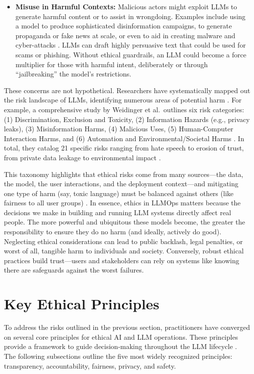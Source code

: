 \begin{itemize}
    \item \textbf{Misuse in Harmful Contexts:} Malicious actors might exploit LLMs to generate harmful content or to assist in wrongdoing. Examples include using a model to produce sophisticated disinformation campaigns, to generate propaganda or fake news at scale, or even to aid in creating malware and cyber-attacks \cite{ar5iv_labs}. LLMs can draft highly persuasive text that could be used for scams or phishing. Without ethical guardrails, an LLM could become a force multiplier for those with harmful intent, deliberately or through ``jailbreaking'' the model's restrictions.
\end{itemize}

These concerns are not hypothetical. Researchers have systematically mapped out the risk landscape of LLMs, identifying numerous areas of potential harm \cite{ar5iv_labs}. For example, a comprehensive study by Weidinger et al.\ outlines six risk categories: (1) Discrimination, Exclusion and Toxicity, (2) Information Hazards (e.g., privacy leaks), (3) Misinformation Harms, (4) Malicious Uses, (5) Human-Computer Interaction Harms, and (6) Automation and Environmental/Societal Harms \cite{ar5iv_labs}. In total, they catalog 21 specific risks ranging from hate speech to erosion of trust, from private data leakage to environmental impact \cite{ar5iv_labs}.

This taxonomy highlights that ethical risks come from many sources---the data, the model, the user interactions, and the deployment context---and mitigating one type of harm (say, toxic language) must be balanced against others (like fairness to all user groups) \cite{ar5iv_labs}. In essence, ethics in LLMOps matters because the decisions we make in building and running LLM systems directly affect real people. The more powerful and ubiquitous these models become, the greater the responsibility to ensure they do no harm (and ideally, actively do good). Neglecting ethical considerations can lead to public backlash, legal penalties, or worst of all, tangible harm to individuals and society. Conversely, robust ethical practices build trust---users and stakeholders can rely on systems like \ishtar{} knowing there are safeguards against the worst failures.

\section{Key Ethical Principles}\label{sec:ethics-principles}

To address the risks outlined in the previous section, practitioners have converged on several core principles for ethical AI and LLM operations. These principles provide a framework to guide decision-making throughout the LLM lifecycle \cite{bcg2023,iapp2023}. The following subsections outline the five most widely recognized principles: transparency, accountability, fairness, privacy, and safety.

